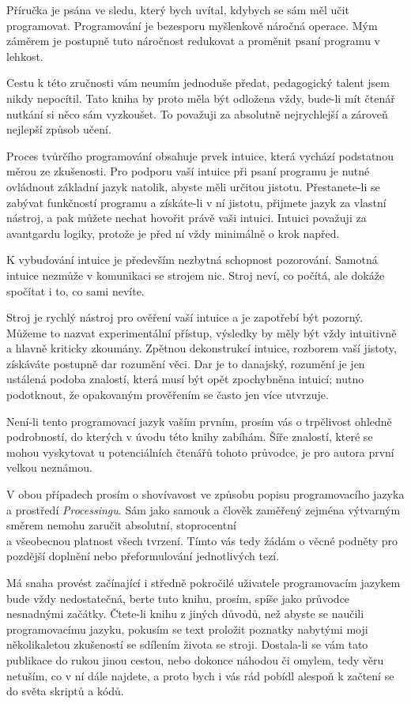 \documentclass[10pt,twoside=true,open=right,cleardoublepage=empty,chapterprefix=true]{scrbook}
\begin{document}
Příručka je psána ve sledu, který bych uvítal, kdybych se sám měl učit programovat. Programování je bezesporu myšlenkově náročná operace. Mým záměrem je postupně tuto náročnost redukovat a proměnit psaní programu v lehkost.

Cestu k této zručnosti vám neumím jednoduše předat, pedagogický talent jsem nikdy nepocítil. Tato kniha by proto měla být odložena vždy, bude-li mít čtenář nutkání si něco sám vyzkoušet. To považuji za absolutně nejrychlejší a zároveň nejlepší způsob učení.

Proces tvůrčího programování obsahuje prvek intuice, která vychází podstatnou měrou ze zkušenosti. Pro podporu vaší intuice při psaní programu je nutné ovládnout základní jazyk natolik, abyste měli určitou jistotu. Přestanete-li se zabývat funkčností programu a získáte-li v ní jistotu, přijmete jazyk za vlastní nástroj, a pak můžete nechat hovořit právě vaši intuici. Intuici považuji za avantgardu logiky, protože je před ní vždy minimálně o krok napřed.

K vybudování intuice je především nezbytná schopnost pozorování. Samotná intuice nezmůže v komunikaci se strojem nic. Stroj neví, co počítá, ale dokáže spočítat i to, co sami nevíte.

Stroj je rychlý nástroj pro ověření vaší intuice a je zapotřebí být pozorný. Můžeme to nazvat experimentální přístup, výsledky by měly být vždy intuitivně a hlavně kriticky zkoumány. Zpětnou dekonstrukcí intuice, rozborem vaší jistoty, získáváte postupně dar rozumění věci. Dar je to danajský, rozumění je jen ustálená podoba znalostí, která musí být opět zpochybněna intuicí; nutno podotknout, že opakovaným prověřením se často jen více utvrzuje. 

Není-li tento programovací jazyk vaším prvním, prosím vás o trpělivost ohledně podrobností, do kterých v úvodu této knihy zabíhám. Šíře znalostí, které se mohou vyskytovat u potenciálních čtenářů tohoto průvodce, je pro autora první velkou neznámou.

V obou případech prosím o shovívavost ve způsobu popisu programovacího jazyka a prostředí {\em Processingu}. Sám jako samouk a člověk zaměřený zejména výtvarným směrem nemohu zaručit absolutní, stoprocentní \\ a všeobecnou platnost všech tvrzení. Tímto vás tedy žádám o věcné podněty pro pozdější doplnění nebo přeformulování jednotlivých tezí.

Má snaha provést začínající i středně pokročilé uživatele programovacím jazykem bude vždy nedostatečná, berte tuto knihu, prosím, spíše jako průvodce nesnadnými začátky. Čtete-li knihu z jiných důvodů, než abyste se naučili programovacímu jazyku, pokusím se text proložit poznatky nabytými moji několikaletou zkušeností se sdílením života se stroji. Dostala-li se vám tato publikace do rukou jinou cestou, nebo dokonce náhodou či omylem, tedy věru netuším, co v ní dále najdete, a proto bych i vás rád pobídl alespoň k začtení se do světa skriptů a kódů.
\end{document}
